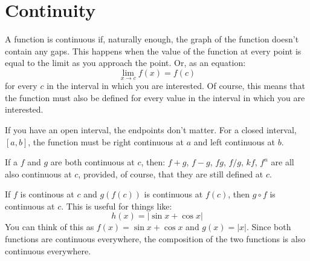 \documentclass[fleqn]{exam}
\begin{document}
\section{Continuity}

A function is continuous if, naturally enough, the graph of the function doesn't contain any gaps.  This happens when
the value of the function at every point is equal to the limit as you approach the point.  Or, as an equation:
\[
  \lim_{x \to c} f(x) = f(c)
\]
for every $c$ in the interval in which you are interested.  Of course, this means that the function must also be defined
for every value in the interval in which you are interested.

If you have an open interval, the endpoints don't matter.  For a closed interval, $[a, b]$, the function must be right
continuous at $a$ and left continuous at $b$.

If a $f$ and $g$ are both continuous at $c$, then: $f + g$, $f - g$, $fg$, $f/g$, $kf$, $f^n$ are all also continuous at
$c$, provided, of course, that they are still defined at $c$.

If $f$ is continous at $c$ and $g(f(c))$ is continuous at $f(c)$, then $g \circ f$ is continuous at $c$.  This is
useful for things like:
\[
  h(x) = | \sin x + \cos x |
\]
You can think of this as $f(x) = \sin x + \cos x$ and $g(x) = |x|$.  Since both functions are continuous everywhere, the
composition of the two functions is also continuous everywhere.



\end{document}
